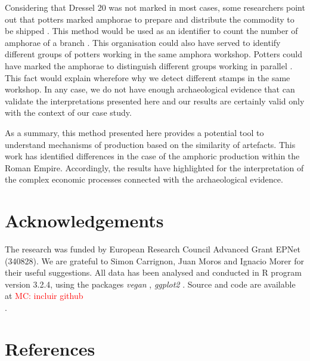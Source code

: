 \documentclass[review]{elsarticle}
\newcommand{\memo}[2]{\textcolor{#1}{#2}}
\newcommand{\maria}[1]{\memo{red}{MC: #1\\}}
\begin{document}
Considering that Dressel 20 was not marked in most cases, some researchers point out that potters marked amphorae to prepare and distribute the commodity to be shipped \citep{berni_millet_epigrafianforica_2008}. This method would be used as an identifier to count the number of amphorae of a branch \citep{juanmorostesis}. This organisation could also have served to identify different groups of potters working in the same amphora workshop. Potters could have marked the amphorae to distinguish different groups working in parallel \citep{li_crossbows_2014}. This fact would explain wherefore why we detect different stamps in the same workshop. In any case, we do not have enough archaeological evidence that can validate the interpretations presented here and our results are certainly valid only with the context of our case study. 

As a summary, this method presented here provides a potential tool to understand mechanisms of production based on the similarity of artefacts. This work has identified differences in the case of the amphoric production within the Roman Empire. Accordingly, the results have highlighted for the interpretation of the complex economic processes connected with the archaeological evidence. 


\section{Acknowledgements}

The research was funded by European Research Council Advanced Grant EPNet (340828). We are grateful to Simon Carrignon, Juan Moros and Ignacio Morer for their useful suggestions.  
All data has been analysed and conducted in R program version 3.2.4, using the packages \textit{vegan} \citep{oksanen_vegan_2007}, \textit{ggplot2} \citep{ggplot2:_2016}. Source and code are available at \maria{incluir github}. 


\section{References}

%

\end{document}
